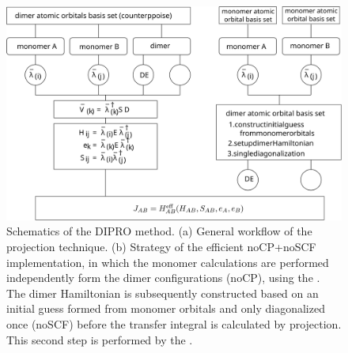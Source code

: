  \begin{figure}[htb]
     \center
     \includegraphics[width=\linewidth]{fig/coupling}
     \caption{Schematics of the DIPRO method. (a) General workflow of the projection technique. (b) Strategy of the efficient noCP+noSCF implementation, in which the monomer calculations are performed independently form the dimer configurations (noCP), using the  \calculator. The dimer Hamiltonian is subsequently constructed based on an initial guess formed from monomer orbitals and only diagonalized once (noSCF) before the transfer integral is calculated by projection. This second step is performed by the  \calculator. }
     \label{fig:dipro_scheme}
 \end{figure}


